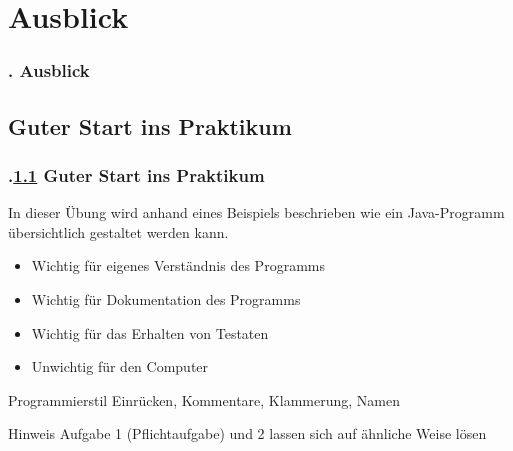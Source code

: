 \section{Ausblick}
\begin{frame}
\frametitle{\kap. Ausblick}%
\tableofcontents[current]
\end{frame}
\def\stitle{Guter Start ins Praktikum}%
\subsection{\stitle}\label{S:Guter Start}
\begin{frame}[t]%
  \frametitle{\kap.\ref{S:Guter Start} \stitle}%

In dieser \"Ubung wird anhand eines Beispiels beschrieben wie ein Java-Programm \"ubersichtlich gestaltet werden kann.

\begin{itemize}
    \item Wichtig f\"ur eigenes Verst\"andnis des Programms
    \item Wichtig f\"ur Dokumentation des Programms
    \item Wichtig f\"ur das Erhalten von Testaten
    \item Unwichtig f\"ur den Computer
\end{itemize}

\bigskip
\begin{block}{Programmierstil}
Einr\"ucken, Kommentare, Klammerung, Namen
\end{block}

\bigskip
\begin{block}{Hinweis}
Aufgabe 1 (Pflichtaufgabe) und 2 lassen sich auf \"ahnliche Weise l\"osen
\end{block}

\end{frame}

\def\stitle{Beispiel Obelisk}%
